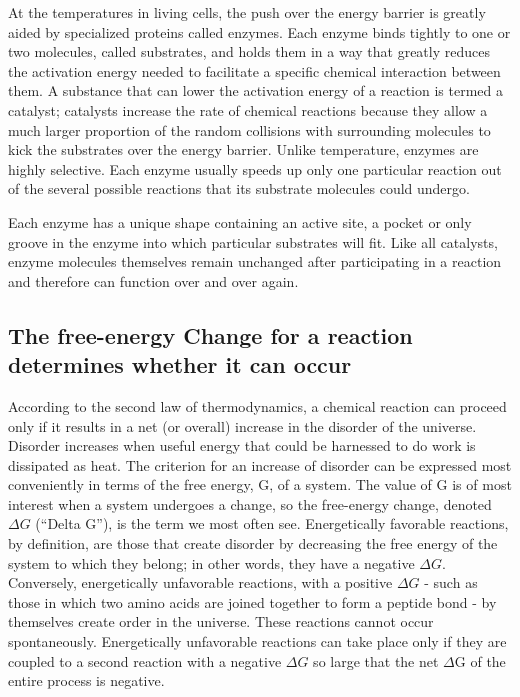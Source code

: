 At the temperatures in living cells, the push over the energy barrier is
greatly aided by specialized proteins called enzymes. Each enzyme binds
tightly to one or two molecules, called substrates, and holds them in
a way that greatly reduces the activation energy needed to facilitate a
specific chemical interaction between them. A substance
that can lower the activation energy of a reaction is termed a catalyst;
catalysts increase the rate of chemical reactions because they allow a
much larger proportion of the random collisions with surrounding molecules
to kick the substrates over the energy barrier.
Unlike temperature, enzymes are highly selective. Each enzyme usually
speeds up only one particular reaction out of the several possible reactions
that its substrate molecules could undergo.

Each enzyme has a unique shape containing an active site, a pocket or only
groove in the enzyme into which particular substrates will fit.
Like all catalysts, enzyme molecules themselves remain unchanged
after participating in a reaction and therefore can function over and over
again.

\subsection{The free-energy Change for a reaction determines whether it can occur}

According to the second law of thermodynamics, a chemical reaction
can proceed only if it results in a net (or overall) increase in the disorder
of the universe. Disorder increases when useful
energy that could be harnessed to do work is dissipated as heat. The
criterion for an increase of disorder can be expressed most conveniently
in terms of the free energy, G, of a system. The value of G is of most
interest when a system undergoes a change, so the free-energy change,
denoted $\Delta G$ (“Delta G”), is the term we most often see.
Energetically favorable reactions, by definition, are those that create disorder
by decreasing the free energy of the system to which they belong; in
other words, they have a negative $\Delta G$. Conversely, energetically unfavorable reactions, with a positive
$\Delta G$ - such as those in which two amino acids are joined together to form
a peptide bond - by themselves create order in the universe. These reactions
cannot occur spontaneously. Energetically unfavorable reactions
can take place only if they are coupled to a second reaction with a negative
$\Delta G$ so large that the net $\Delta$G of the entire process is negative.

